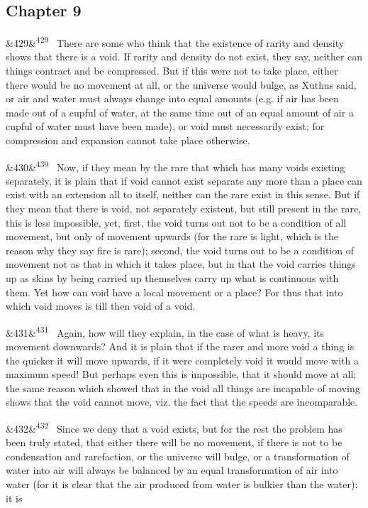 \documentclass[12pt]{article}
\newcommand{\para}[1][]{\par\noindent\ifx&#1&\else\textsuperscript{\footnotesize #1}~\fi}
\begin{document}
\subsection*{Chapter 9}

\para[429] There are some who think that the existence of rarity and density shows that there is a void. If rarity and density do not exist, they say, neither can things contract and be compressed. But if this were not to take place, either there would be no movement at all, or the universe would bulge, as Xuthus said, or air and water must always change into equal amounts (e.g. if air has been made out of a cupful of water, at the same time out of an equal amount of air a cupful of water must have been made), or void must necessarily exist; for compression and expansion cannot take place otherwise.

\para[430] Now, if they mean by the rare that which has many voids existing separately, it is plain that if void cannot exist separate any more than a place can exist with an extension all to itself, neither can the rare exist in this sense. But if they mean that there is void, not separately existent, but still present in the rare, this is less impossible, yet, first, the void turns out not to be a condition of all movement, but only of movement upwards (for the rare is light, which is the reason why they say fire is rare); second, the void turns out to be a condition of movement not as that in which it takes place, but in that the void carries things up as skins by being carried up themselves carry up what is continuous with them. Yet how can void have a local movement or a place? For thus that into which void moves is till then void of a void.

\para[431] Again, how will they explain, in the case of what is heavy, its movement downwards? And it is plain that if the rarer and more void a thing is the quicker it will move upwards, if it were completely void it would move with a maximum speed! But perhaps even this is impossible, that it should move at all; the same reason which showed that in the void all things are incapable of moving shows that the void cannot move, viz. the fact that the speeds are incomparable.

\para[432] Since we deny that a void exists, but for the rest the problem has been truly stated, that either there will be no movement, if there is not to be condensation and rarefaction, or the universe will bulge, or a transformation of water into air will always be balanced by an equal transformation of air into water (for it is clear that the air produced from water is bulkier than the water): it is
\end{document}
